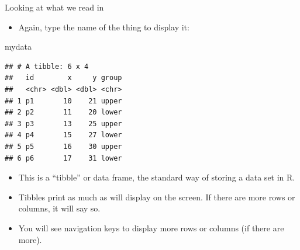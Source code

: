 \documentclass[ignorenonframetext,]{beamer}
\newenvironment{Shaded}{\begin{snugshade}}{\end{snugshade}}
\newcommand{\NormalTok}[1]{#1}
\providecommand{\tightlist}{%
  \setlength{\itemsep}{0pt}\setlength{\parskip}{0pt}}
\begin{document}
\begin{frame}[fragile]{Looking at what we read in}
\protect\hypertarget{looking-at-what-we-read-in}{}

\begin{itemize}
\tightlist
\item
  Again, type the name of the thing to display it:
\end{itemize}

\scriptsize

\begin{Shaded}
\begin{Highlighting}[]
\NormalTok{mydata}
\end{Highlighting}
\end{Shaded}

\begin{verbatim}
## # A tibble: 6 x 4
##   id        x     y group
##   <chr> <dbl> <dbl> <chr>
## 1 p1       10    21 upper
## 2 p2       11    20 lower
## 3 p3       13    25 upper
## 4 p4       15    27 lower
## 5 p5       16    30 upper
## 6 p6       17    31 lower
\end{verbatim}

\normalsize

\begin{itemize}
\tightlist
\item
  This is a ``tibble'' or data frame, the standard way of storing a data
  set in R.
\item
  Tibbles print as much as will display on the screen. If there are more
  rows or columns, it will say so.
\item
  You will see navigation keys to display more rows or columns (if there
  are more).
\end{itemize}

\end{frame}
\end{document}
